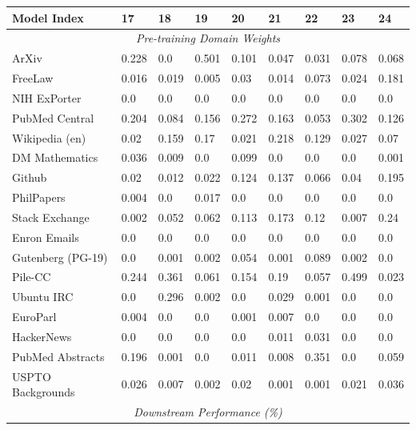 \documentclass{article}
\theoremstyle{definition}
\theoremstyle{remark}
\begin{document}
\begin{table}[!ht]
    \centering
    \begin{tabular}{lllllllll}
    \toprule
        \textbf{Model Index} & \textbf{17} & \textbf{18} & \textbf{19} & \textbf{20} & \textbf{21} & \textbf{22} & \textbf{23} & \textbf{24} \\
        \midrule
        \multicolumn{9}{c}{\textit{Pre-training Domain Weights}} \\
        ArXiv & 0.228 & 0.0 & 0.501 & 0.101 & 0.047 & 0.031 & 0.078 & 0.068 \\ 
        FreeLaw & 0.016 & 0.019 & 0.005 & 0.03 & 0.014 & 0.073 & 0.024 & 0.181 \\ 
        NIH ExPorter & 0.0 & 0.0 & 0.0 & 0.0 & 0.0 & 0.0 & 0.0 & 0.0 \\ 
        PubMed Central & 0.204 & 0.084 & 0.156 & 0.272 & 0.163 & 0.053 & 0.302 & 0.126 \\ 
        Wikipedia (en) & 0.02 & 0.159 & 0.17 & 0.021 & 0.218 & 0.129 & 0.027 & 0.07 \\ 
        DM Mathematics & 0.036 & 0.009 & 0.0 & 0.099 & 0.0 & 0.0 & 0.0 & 0.001 \\ 
        Github & 0.02 & 0.012 & 0.022 & 0.124 & 0.137 & 0.066 & 0.04 & 0.195 \\ 
        PhilPapers & 0.004 & 0.0 & 0.017 & 0.0 & 0.0 & 0.0 & 0.0 & 0.0 \\ 
        Stack Exchange & 0.002 & 0.052 & 0.062 & 0.113 & 0.173 & 0.12 & 0.007 & 0.24 \\ 
        Enron Emails & 0.0 & 0.0 & 0.0 & 0.0 & 0.0 & 0.0 & 0.0 & 0.0 \\ 
        Gutenberg (PG-19) & 0.0 & 0.001 & 0.002 & 0.054 & 0.001 & 0.089 & 0.002 & 0.0 \\ 
        Pile-CC & 0.244 & 0.361 & 0.061 & 0.154 & 0.19 & 0.057 & 0.499 & 0.023 \\ 
        Ubuntu IRC & 0.0 & 0.296 & 0.002 & 0.0 & 0.029 & 0.001 & 0.0 & 0.0 \\ 
        EuroParl & 0.004 & 0.0 & 0.0 & 0.001 & 0.007 & 0.0 & 0.0 & 0.0 \\ 
        HackerNews & 0.0 & 0.0 & 0.0 & 0.0 & 0.011 & 0.031 & 0.0 & 0.0 \\ 
        PubMed Abstracts & 0.196 & 0.001 & 0.0 & 0.011 & 0.008 & 0.351 & 0.0 & 0.059 \\ 
        USPTO Backgrounds & 0.026 & 0.007 & 0.002 & 0.02 & 0.001 & 0.001 & 0.021 & 0.036 \\
        \midrule
        \multicolumn{9}{c}{\textit{Downstream Performance (\%)}} \\

\end{tabular}
\end{table}
\end{document}
